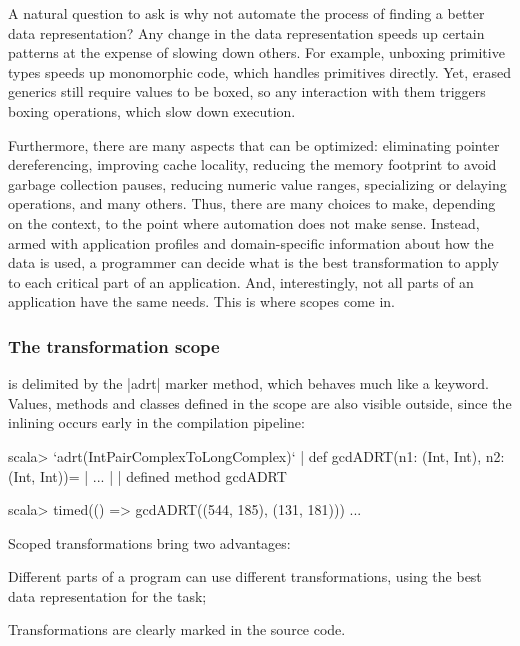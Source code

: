 A natural question to ask is why not automate the process of finding a better data representation? Any change in the data representation speeds up certain patterns at the expense of slowing down others. For example, unboxing primitive types speeds up monomorphic code, which handles primitives directly. Yet, erased generics still require values to be boxed, so any interaction with them triggers boxing operations, which slow down execution. %

Furthermore, there are many aspects that can be optimized: eliminating pointer dereferencing, improving cache locality, reducing the memory footprint to avoid garbage collection pauses, reducing numeric value ranges, specializing or delaying operations, and many others. Thus, there are many choices to make, depending on the context, to the point where automation does not make sense. Instead, armed with application profiles and domain-specific information about how the data is used, a programmer can decide what is the best transformation to apply to each critical part of an application. And, interestingly, not all parts of an application have the same needs. This is where scopes come in.

\vspace{-0.2em}

\subsubsection{The transformation scope} is delimited by the |adrt| marker method, which behaves much like a keyword. Values, methods and classes defined in the scope are also visible outside, since the inlining occurs early in the compilation pipeline:

\begin{lstlisting-nobreak}
scala> `adrt(IntPairComplexToLongComplex)` {
       |   def gcdADRT(n1: (Int, Int), n2: (Int, Int))={
       |     ...
       |   }
       | }
defined method gcdADRT

scala> timed(() => gcdADRT((544, 185), (131, 181)))
...
\end{lstlisting-nobreak}

Scoped transformations bring two advantages:

\vspace{0.25em}
\begin{compactitem}
 \item Different parts of a program can use different transformations, using the best data representation for the task;
 \item Transformations are clearly marked in the source code.
\end{compactitem}
\vspace{0.25em}


